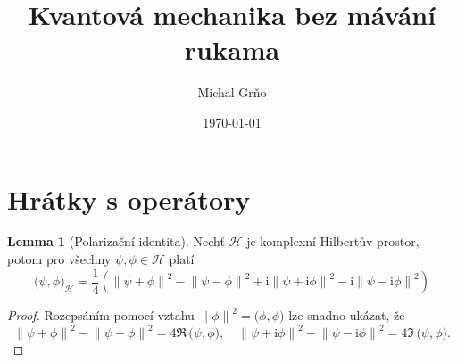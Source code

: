 \documentclass[10pt,a4paper]{article}
\theoremstyle{definition}
\newtheorem{lemma}[theorem]{Lemma}
\newcommand{\const}[1]{\mathrm{#1}}
\newcommand{\norm}[1]{\left\lVert#1\right\rVert}
\newcommand{\innerprod}[2]{\big( #1, #2 \big)}
\renewcommand{\i}{\const{i}}
\def\H{\mathcal{H}}
\begin{document}
\title{Kvantová mechanika bez mávání rukama}
\author{Michal Grňo}
\date{\today}

\maketitle

\section{Hrátky s operátory}
\begin{lemma}[Polarizační identita]
    \label{polarizacni-identita}
    Nechť $\H$ je komplexní Hilbertův prostor, potom pro všechny $\psi, \phi \in \H$ platí
    \begin{equation*}
        \innerprod{\psi}{\phi}_\H
        =
        \frac{1}{4}
        \left(
            \norm{\psi + \phi}^2
            - \norm{\psi - \phi}^2
            + \i \norm{\psi + \i \phi}^2
            - \i \norm{\psi - \i \phi}^2
        \right)
    \end{equation*}
\end{lemma}
\begin{proof}
    Rozepsáním pomocí vztahu $\norm{\phi}^2 = \innerprod{\phi}{\phi}$ lze snadno ukázat, že
    \begin{equation*}
        \norm{\psi + \phi}^2 - \norm{\psi - \phi}^2
        = 4 \Re \, \innerprod{\psi}{\phi},
        \quad
        \norm{\psi + \i\phi}^2 - \norm{\psi - \i\phi}^2
        = 4 \Im \, \innerprod{\psi}{\phi}.
    \end{equation*}
\end{proof}
\end{document}
